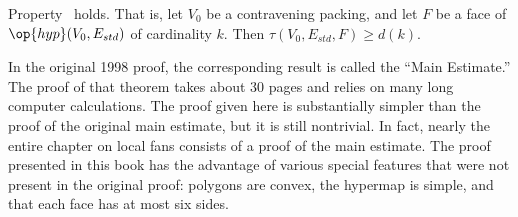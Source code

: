 %






\begin{lemma}[]\label{lemma:main} 
Property~ holds.  That is,
let $V_0$ be a contravening packing, and  let $F$ be a
face of $\op{hyp}(V_0,E_{std})$ of cardinality $k$.  Then
$\tau(V_0,E_{std},F) \ge d(k)$.
\end{lemma}
%
%


\begin{remark}
  In the original 1998 proof, the corresponding result is called the
  ``Main Estimate.''  The proof of that theorem takes about 30 pages
  and relies on many long computer calculations.  The proof given here
  is substantially simpler than the proof of the original main
  estimate, but it is still nontrivial. In fact, nearly the entire
  chapter on local fans consists of a proof of the main estimate.
  The proof presented in this book has the advantage of various
  special features that were not present in the original proof:
  polygons are convex, the hypermap is simple, and that each face has
  at most six sides.
\end{remark}




